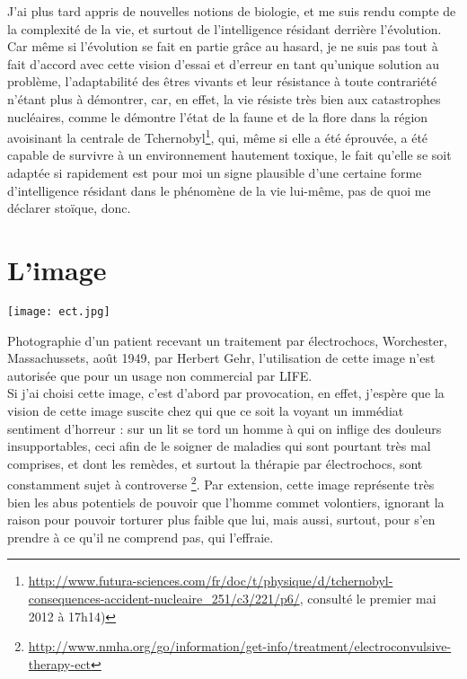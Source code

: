 \documentclass[12pt,a4paper]{article}
\begin{document}
{J'ai plus tard appris de nouvelles notions de biologie, et me suis rendu compte de la complexité de la vie, et surtout de l'intelligence résidant derrière l'évolution. Car même si l'évolution se fait en partie grâce au hasard, je ne suis pas tout à fait d'accord avec cette vision d'essai et d'erreur en tant qu'unique solution au problème, l'adaptabilité des êtres vivants et leur résistance à toute contrariété n'étant plus à démontrer, car, en effet, la vie résiste très bien aux catastrophes nucléaires, comme le démontre l'état de la faune et de la flore dans la région avoisinant la centrale de Tchernobyl\footnote{\url{http://www.futura-sciences.com/fr/doc/t/physique/d/tchernobyl-consequences-accident-nucleaire_251/c3/221/p6/}, consulté le premier mai 2012 à 17h14)}, qui, même si elle a été éprouvée, a été capable de survivre à un environnement hautement toxique, le fait qu'elle se soit adaptée si rapidement est pour moi un signe plausible d'une certaine forme d'intelligence résidant dans le phénomène de la vie lui-même, pas de quoi me déclarer stoïque, donc.\\

\part{L'image}

\texttt{[image: ect.jpg]}

Photographie d'un patient recevant un traitement par électrochocs, Worchester, Massachussets, août 1949, par Herbert Gehr, l'utilisation de cette image n'est autorisée que pour un usage non commercial par \textsc{LIFE}.\\

Si j'ai choisi cette image, c'est d'abord par provocation, en effet, j'espère que la vision de cette image suscite chez qui que ce soit la voyant un immédiat sentiment d'horreur : sur un lit se tord un homme à qui on inflige des douleurs insupportables, ceci afin de le soigner de maladies qui sont pourtant très mal comprises, et dont les remèdes, et surtout la thérapie par électrochocs, sont constamment sujet à controverse \footnote{ \url{http://www.nmha.org/go/information/get-info/treatment/electroconvulsive-therapy-ect}}. Par extension, cette image représente très bien les abus potentiels de pouvoir que l'homme commet volontiers, ignorant la raison pour pouvoir torturer plus faible que lui, mais aussi, surtout, pour s'en prendre à ce qu'il ne comprend pas, qui l'effraie.\\

}
\end{document}
